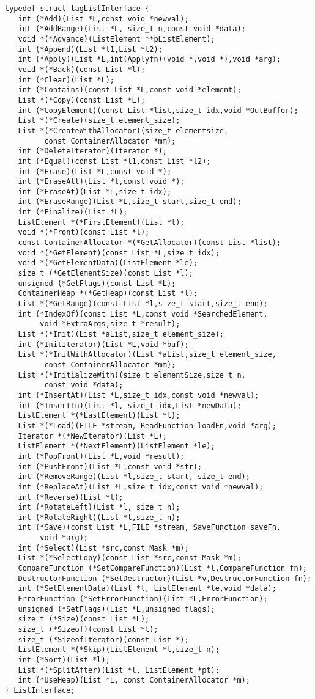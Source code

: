 \begin{verbatim}
typedef struct tagListInterface {
   int (*Add)(List *L,const void *newval);
   int (*AddRange)(List *L, size_t n,const void *data);
   void *(*Advance)(ListElement **pListElement);
   int (*Append)(List *l1,List *l2);
   int (*Apply)(List *L,int(Applyfn)(void *,void *),void *arg);
   void *(*Back)(const List *l);
   int (*Clear)(List *L);
   int (*Contains)(const List *L,const void *element);
   List *(*Copy)(const List *L);
   int (*CopyElement)(const List *list,size_t idx,void *OutBuffer);
   List *(*Create)(size_t element_size);
   List *(*CreateWithAllocator)(size_t elementsize,
         const ContainerAllocator *mm);
   int (*DeleteIterator)(Iterator *);
   int (*Equal)(const List *l1,const List *l2);
   int (*Erase)(List *L,const void *);
   int (*EraseAll)(List *l,const void *);
   int (*EraseAt)(List *L,size_t idx);
   int (*EraseRange)(List *L,size_t start,size_t end);
   int (*Finalize)(List *L);
   ListElement *(*FirstElement)(List *l);
   void *(*Front)(const List *l);
   const ContainerAllocator *(*GetAllocator)(const List *list);
   void *(*GetElement)(const List *L,size_t idx);
   void *(*GetElementData)(ListElement *le);
   size_t (*GetElementSize)(const List *l);
   unsigned (*GetFlags)(const List *L);
   ContainerHeap *(*GetHeap)(const List *l);
   List *(*GetRange)(const List *l,size_t start,size_t end);
   int (*IndexOf)(const List *L,const void *SearchedElement,
        void *ExtraArgs,size_t *result);
   List *(*Init)(List *aList,size_t element_size);
   int (*InitIterator)(List *L,void *buf);
   List *(*InitWithAllocator)(List *aList,size_t element_size,
         const ContainerAllocator *mm);
   List *(*InitializeWith)(size_t elementSize,size_t n,
         const void *data);
   int (*InsertAt)(List *L,size_t idx,const void *newval);
   int (*InsertIn)(List *l, size_t idx,List *newData);
   ListElement *(*LastElement)(List *l);
   List *(*Load)(FILE *stream, ReadFunction loadFn,void *arg);
   Iterator *(*NewIterator)(List *L);
   ListElement *(*NextElement)(ListElement *le);
   int (*PopFront)(List *L,void *result);
   int (*PushFront)(List *L,const void *str);
   int (*RemoveRange)(List *l,size_t start, size_t end);
   int (*ReplaceAt)(List *L,size_t idx,const void *newval);
   int (*Reverse)(List *l);
   int (*RotateLeft)(List *l, size_t n);
   int (*RotateRight)(List *l,size_t n);
   int (*Save)(const List *L,FILE *stream, SaveFunction saveFn,
        void *arg);
   int (*Select)(List *src,const Mask *m);
   List *(*SelectCopy)(const List *src,const Mask *m);
   CompareFunction (*SetCompareFunction)(List *l,CompareFunction fn);
   DestructorFunction (*SetDestructor)(List *v,DestructorFunction fn);
   int (*SetElementData)(List *l, ListElement *le,void *data);
   ErrorFunction (*SetErrorFunction)(List *L,ErrorFunction);
   unsigned (*SetFlags)(List *L,unsigned flags);
   size_t (*Size)(const List *L);
   size_t (*Sizeof)(const List *l);
   size_t (*SizeofIterator)(const List *);
   ListElement *(*Skip)(ListElement *l,size_t n);
   int (*Sort)(List *l);
   List *(*SplitAfter)(List *l, ListElement *pt);
   int (*UseHeap)(List *L, const ContainerAllocator *m);
} ListInterface;
\end{verbatim}
